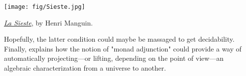 \conjAdjunctionControlledRelations*

\begin{marginfigure}
	\centering
	\texttt{[image: fig/Sieste.jpg]}
	\caption{\href{https://commons.wikimedia.org/wiki/File:Henri_Manguin,_1905,_La_Sieste_(Le_repos,_Jeanne),_oil_on_canvas,_88.9_x_116.84_cm,_Villa_Flora,_Winterthur.jpg}{\emph{La Sieste}}, by Henri Manguin.}
\end{marginfigure}
Hopefully, the latter condition could maybe be massaged to get decidability.
Finally,  explains how the notion
of "monad adjunction" could provide a way of automatically projecting---or lifting,
depending on the point of view---an algebraic characterization from a universe to another.

\projectingAlgebraicCharacterization*
